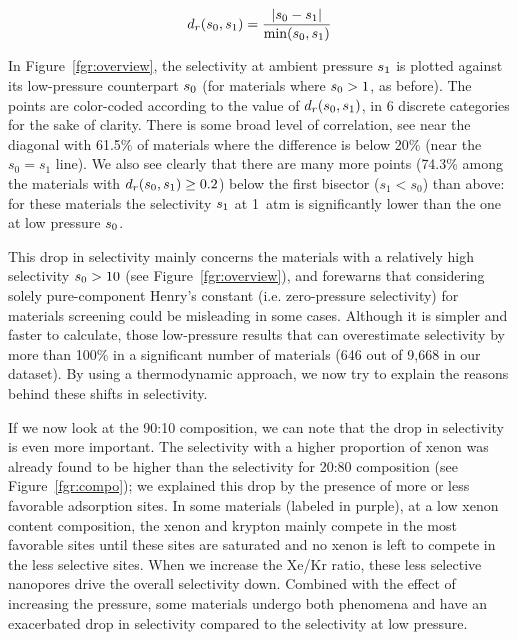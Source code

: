 \documentclass[main.tex]{subfiles}
\begin{document}
\begin{equation} \label{eqn:reldiff}
    d_r(s_{\text{0}},s_{\text{1}}) = \dfrac{\lvert s_{\text{0}} - s_{\text{1}} \rvert}{\min(s_{\text{0}},s_{\text{1}})}
\end{equation}

In Figure~\ref{fgr:overview}, the selectivity at ambient pressure $s_{\text{1}}$ is plotted against its low-pressure counterpart $s_{\text{0}}$ (for materials where $s_{\text{0}} > 1$, as before). The points are color-coded according to the value of $d_r(s_{\text{0}},s_{\text{1}})$, in 6 discrete categories for the sake of clarity. There is some broad level of correlation, see near the diagonal with {61.5\%} of materials where the difference is below {20\%} (near the $s_0 = s_1$ line). We also see clearly that there are many more points ({74.3\%} among the materials with $d_r(s_{\text{0}},s_{\text{1}})\ge 0.2$) below the first bisector ($s_1 < s_0$) than above: for these materials the selectivity $s_{\text{1}}$ at 1~atm is significantly lower than the one at low pressure $s_{\text{0}}$.

This drop in selectivity mainly concerns the materials with a relatively high selectivity $s_{\text{0}} > 10$ (see Figure~\ref{fgr:overview}), and forewarns that considering solely pure-component Henry's constant (i.e. zero-pressure selectivity) for materials screening could be misleading in some cases. Although it is simpler and faster to calculate, those low-pressure results that can overestimate selectivity by more than {100\%} in a significant number of materials (646 out of 9,668 in our dataset). 
By using a thermodynamic approach, we now try to explain the reasons behind these shifts in selectivity.

If we now look at the 90:10 composition, we can note that the drop in selectivity is even more important. The selectivity with a higher proportion of xenon was already found to be higher than the selectivity for 20:80 composition (see Figure~\ref{fgr:compo}); we explained this drop by the presence of more or less favorable adsorption sites. In some materials (labeled in purple), at a low xenon content composition, the xenon and krypton mainly compete in the most favorable sites until these sites are saturated and no xenon is left to compete in the less selective sites. When we increase the Xe/Kr ratio, these less selective nanopores drive the overall selectivity down. Combined with the effect of increasing the pressure, some materials undergo both phenomena and have an exacerbated drop in selectivity compared to the selectivity at low pressure. 
\end{document}
